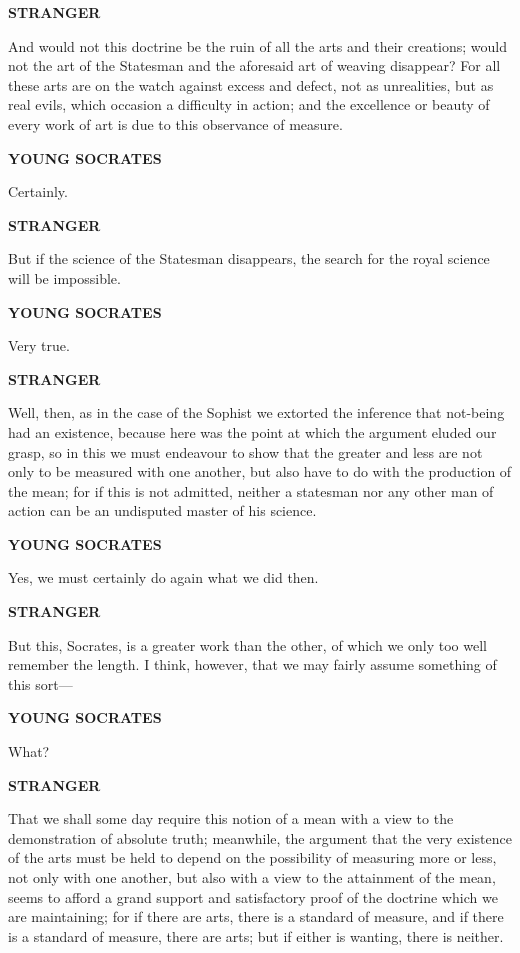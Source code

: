\documentclass[11pt,letter]{article}
\begin{document}
\par \textbf{STRANGER}
\par   And would not this doctrine be the ruin of all the arts and their creations; would not the art of the Statesman and the aforesaid art of weaving disappear? For all these arts are on the watch against excess and defect, not as unrealities, but as real evils, which occasion a difficulty in action; and the excellence or beauty of every work of art is due to this observance of measure.

\par \textbf{YOUNG SOCRATES}
\par   Certainly.

\par \textbf{STRANGER}
\par   But if the science of the Statesman disappears, the search for the royal science will be impossible.

\par \textbf{YOUNG SOCRATES}
\par   Very true.

\par \textbf{STRANGER}
\par   Well, then, as in the case of the Sophist we extorted the inference that not-being had an existence, because here was the point at which the argument eluded our grasp, so in this we must endeavour to show that the greater and less are not only to be measured with one another, but also have to do with the production of the mean; for if this is not admitted, neither a statesman nor any other man of action can be an undisputed master of his science.

\par \textbf{YOUNG SOCRATES}
\par   Yes, we must certainly do again what we did then.

\par \textbf{STRANGER}
\par   But this, Socrates, is a greater work than the other, of which we only too well remember the length. I think, however, that we may fairly assume something of this sort—

\par \textbf{YOUNG SOCRATES}
\par   What?

\par \textbf{STRANGER}
\par   That we shall some day require this notion of a mean with a view to the demonstration of absolute truth; meanwhile, the argument that the very existence of the arts must be held to depend on the possibility of measuring more or less, not only with one another, but also with a view to the attainment of the mean, seems to afford a grand support and satisfactory proof of the doctrine which we are maintaining; for if there are arts, there is a standard of measure, and if there is a standard of measure, there are arts; but if either is wanting, there is neither.
\end{document}

